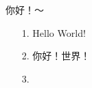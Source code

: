 \documentclass[]{article}
\begin{document}
你好！～
\begin{itemize}
    \item[1.] Hello World!
    \item[2.] 你好！世界！
    \item[3.]
\end{itemize}

\end{document}
